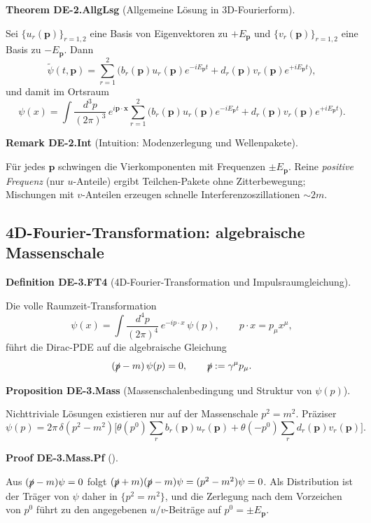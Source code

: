 \documentclass[10pt, letterpaper]{article}
\newcommand{\CustomHeading}[3]{%
  \par\medskip\noindent%
  \textbf{#1 #2} \textnormal{(#3)}.\enskip%
}
\newenvironment{DEF}[2]{\begin{unitbox}\CustomHeading{Definition}{#1}{#2}}{\end{unitbox}}
\newenvironment{PROP}[2]{\begin{unitbox}\CustomHeading{Proposition}{#1}{#2}}{\end{unitbox}}
\newenvironment{THEO}[2]{\begin{unitbox}\CustomHeading{Theorem}{#1}{#2}}{\end{unitbox}}
\newenvironment{REM}[2]{\begin{unitbox}\CustomHeading{Remark}{#1}{#2}}{\end{unitbox}}
\newenvironment{PROOF}[2]{\begin{unitbox}\CustomHeading{Proof}{#1}{#2}}{\end{unitbox}}
\begin{document}
\begin{THEO}{DE-2.AllgLsg}{Allgemeine Lösung in 3D-Fourierform}
Sei $\{u_r(\mathbf p)\}_{r=1,2}$ eine Basis von Eigenvektoren zu $+E_{\mathbf p}$ und $\{v_r(\mathbf p)\}_{r=1,2}$ eine Basis zu $-E_{\mathbf p}$. Dann
\[
\tilde\psi(t,\mathbf p)=\sum_{r=1}^2\Big(b_r(\mathbf p)u_r(\mathbf p)e^{-iE_{\mathbf p}t}
+d_r(\mathbf p)v_r(\mathbf p)e^{+iE_{\mathbf p}t}\Big),
\]
und damit im Ortsraum
\[
\psi(x)=\int\!\frac{d^3p}{(2\pi)^3}\,e^{i\mathbf p\cdot\mathbf x}\sum_{r=1}^2
\Big(b_r(\mathbf p)u_r(\mathbf p)e^{-iE_{\mathbf p}t}
+d_r(\mathbf p)v_r(\mathbf p)e^{+iE_{\mathbf p}t}\Big).
\]
\end{THEO}

\begin{REM}{DE-2.Int}{Intuition: Modenzerlegung und Wellenpakete}
Für jedes $\mathbf p$ schwingen die Vierkomponenten mit Frequenzen $\pm E_{\mathbf p}$. Reine \emph{positive Frequenz} (nur $u$-Anteile) ergibt Teilchen-Pakete ohne Zitterbewegung; Mischungen mit $v$-Anteilen erzeugen schnelle Interferenzoszillationen $\sim 2m$.
\end{REM}

\subsection{4D-Fourier-Transformation: algebraische Massenschale}

\begin{DEF}{DE-3.FT4}{4D-Fourier-Transformation und Impulsraumgleichung}
Die volle Raumzeit-Transformation
\[
\psi(x)=\int\!\frac{d^4p}{(2\pi)^4}\,e^{-ip\cdot x}\,\psi(p),\qquad p\cdot x=p_\mu x^\mu,
\]
führt die Dirac-PDE auf die algebraische Gleichung
\[
(\slashed p - m)\,\psi(p)=0,\qquad \slashed p:=\gamma^\mu p_\mu.
\]
\end{DEF}

\begin{PROP}{DE-3.Mass}{Massenschalenbedingung und Struktur von $\psi(p)$}
Nichttriviale Lösungen existieren nur auf der Massenschale $p^2=m^2$. Präziser
\[
\psi(p)=2\pi\,\delta(p^2-m^2)\Big[\theta(p^0)\sum_{r}b_r(\mathbf p)u_r(\mathbf p)
+\theta(-p^0)\sum_{r}d_r(\mathbf p)v_r(\mathbf p)\Big].
\]
\end{PROP}

\begin{PROOF}{DE-3.Mass.Pf}{}
Aus $(\slashed p-m)\psi=0$ folgt $(\slashed p+m)(\slashed p-m)\psi=(p^2-m^2)\psi=0$. Als Distribution ist der Träger von $\psi$ daher in $\{p^2=m^2\}$, und die Zerlegung nach dem Vorzeichen von $p^0$ führt zu den angegebenen $u/v$-Beiträge auf $p^0=\pm E_{\mathbf p}$.
\end{PROOF}
\end{document}
